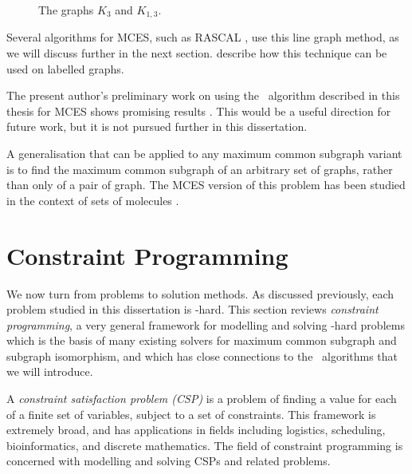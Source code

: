 \begin{figure}[htb]
    \centering
    
    \caption{The graphs $K_3$ and $K_{1,3}$.}
    \label{fig:k3-and-claw}
\end{figure}

Several algorithms for MCES, such as RASCAL
\citep{DBLP:journals/cj/RaymondGW02}, use this line graph method, as we will discuss further
in the next section.  \citet{DBLP:conf/mco/VismaraV08} describe how this technique
can be used on labelled graphs.

The present author's preliminary work on using the \McSplit\ algorithm
described in this thesis for MCES shows promising results
\citep{trimble2018three}. This would be a useful direction for future work, but
it is not pursued further in this dissertation.

A generalisation that can be applied to any maximum common subgraph
variant is to find the maximum common subgraph of an arbitrary set of graphs,
rather than only of a pair of graph.  The MCES version of this problem has
been studied in the context of sets of molecules
\citep{DBLP:journals/jcheminf/DalkeH13}.


\section{Constraint Programming}\label{sec:cp}

We now turn from problems to solution methods.  As discussed previously, each
problem studied in this dissertation is \NP-hard.  This section reviews
\emph{constraint programming}, a very general framework for modelling and
solving \NP-hard problems which is the basis of many existing solvers for
maximum common subgraph and subgraph isomorphism, and which has close
connections to the \McSplit\ algorithms that we will introduce.

A \emph{constraint satisfaction problem (CSP)} is a problem of finding a value
for each of a finite set of variables, subject to a set of constraints.
This framework is extremely broad, and has applications in fields
including logistics, scheduling, bioinformatics, and discrete mathematics.
The field of constraint programming is concerned with modelling
and solving CSPs and related problems.

